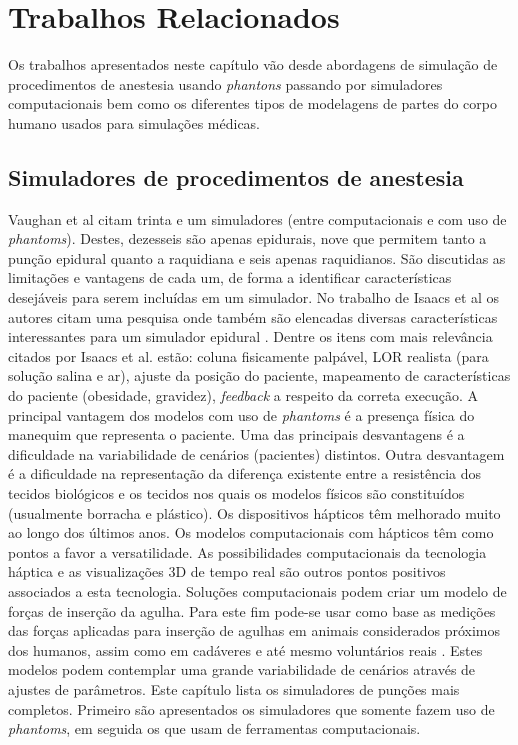 \chapter{Trabalhos Relacionados} \label{cap:cap3}

Os trabalhos apresentados neste capítulo vão desde abordagens de simulação de procedimentos de anestesia usando \textit{phantons} passando por simuladores computacionais bem como os diferentes tipos de modelagens de partes do corpo humano usados para simulações médicas.  

\section {Simuladores de procedimentos de anestesia}

Vaughan et al \cite{Vaughan2013} citam trinta e um simuladores (entre computacionais e com uso de \textit{phantoms}). Destes, dezesseis são apenas epidurais, nove que permitem tanto a punção epidural quanto a raquidiana e seis apenas raquidianos. São discutidas as limitações e vantagens de cada um, de forma a identificar características desejáveis para serem incluídas em um simulador. No trabalho de Isaacs et al os autores citam uma pesquisa onde também são elencadas diversas características interessantes para um simulador epidural \cite{Isaacs2015}. Dentre os itens com mais relevância citados por Isaacs et al. estão: coluna fisicamente palpável, LOR realista (para solução salina e ar), ajuste da posição do paciente, mapeamento de características do paciente (obesidade, gravidez), \textit{feedback} a respeito da correta execução.
A principal vantagem dos modelos com uso de \textit{phantoms} é a presença física do manequim que representa o paciente. Uma das principais desvantagens é a dificuldade na variabilidade de cenários (pacientes) distintos. Outra desvantagem é a dificuldade na representação da diferença existente entre a resistência dos tecidos biológicos e os tecidos nos quais os modelos físicos são constituídos (usualmente borracha e plástico).
Os dispositivos hápticos têm melhorado muito ao longo dos últimos anos. Os modelos computacionais com hápticos têm como pontos a favor a versatilidade. As possibilidades computacionais da tecnologia háptica e as visualizações 3D de tempo real são outros pontos positivos associados a esta tecnologia. 
Soluções computacionais podem criar um modelo de forças de inserção da agulha. Para este fim pode-se usar como base as medições das forças aplicadas para inserção de agulhas em animais considerados próximos dos humanos, assim como em cadáveres e até mesmo voluntários reais \cite{Hiemenz1998,Holton2001,Langton1990,McKay2010,Naemura2009,Tran2009,Vaughan2012}. Estes modelos podem contemplar uma grande variabilidade de cenários através de ajustes de parâmetros. 
Este capítulo lista os simuladores de punções mais completos. Primeiro são apresentados os simuladores que somente fazem uso de \textit{phantoms}, em seguida os que usam de ferramentas computacionais.



